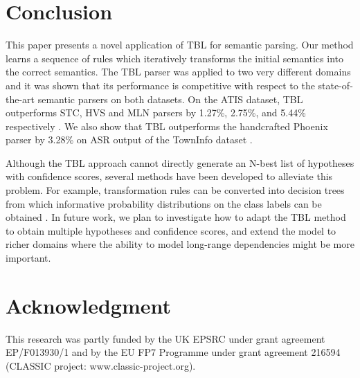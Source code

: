 \documentclass{article}
\begin{document}
\section{Conclusion} \label{sec:conlusion}

This paper presents a novel application of TBL for semantic parsing. Our method learns a sequence of rules which iteratively transforms the initial semantics into the correct semantics.
The TBL parser was applied to two very different domains and it was shown that its performance is competitive with respect to the state-of-the-art semantic parsers on both datasets. 
On the ATIS dataset, TBL outperforms STC, HVS and MLN parsers by 1.27\%, 2.75\%, and 5.44\% respectively \cite{mairesse09,he05,meza08b}. We also show that TBL outperforms the handcrafted Phoenix parser by 3.28\% on ASR output of the TownInfo dataset \cite{mairesse09}.

Although the TBL approach cannot directly generate an N-best list of hypotheses with confidence scores, several methods have been developed to alleviate this problem. For example, transformation rules can be converted into decision trees from which informative probability distributions on the class labels can be obtained \cite{florian00}. In future work, we plan to investigate how to adapt the TBL method to obtain multiple hypotheses and confidence scores, and extend the model to richer domains where the ability to model long-range dependencies might be more important.

\section{Acknowledgment}
This research was partly funded by the UK EPSRC
under grant agreement EP/F013930/1 and by the
EU FP7 Programme under grant agreement 216594
(CLASSIC project: www.classic-project.org).

\eightpt


\end{document}
